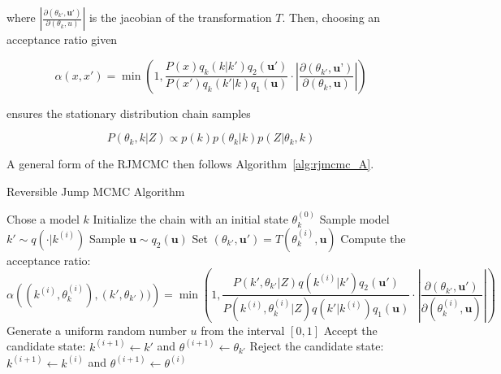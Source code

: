 \documentclass{article}
\begin{document}
where $\left|\frac{\partial(\theta_{k'}, \textbf{u}')}{\partial(\theta_k, u)} \right|$ is the jacobian of the transformation $T$. Then, choosing an acceptance ratio given 
 
 \begin{equation}
 \label{eq:alpharj}
  \alpha\left(x, x'\right) = \min\left(1, \frac{P(x)q_k(k | k')q_2(\textbf{u}') }{P(x')q_k(k' | k)q_1(\textbf{u}) }\cdot\left|\frac{\partial(\theta_{k'}, \textbf{u'})}{\partial(\theta_k, \mathbf{u})} \right|\right)
 \end{equation}


ensures the stationary distribution chain samples

\begin{equation}
P(\theta_k, k | Z) \propto p(k)p(\theta_k|k)p(Z | \theta_k, k)
\end{equation}

A general form of the RJMCMC then follows Algorithm~\ref{alg:rjmcmc_A}.

\begin{algorithm}[H]
\caption{Reversible Jump MCMC Algorithm}
\label{alg:rjmcmc_A}
\begin{algorithmic}[1]
    \State Chose a model $k$
    \State Initialize the chain with an initial state $\theta^{(0)}_{k}$
         \State Sample model $k' \sim q(\cdot | k^{(i)})$
         \State Sample $\mathbf{u} \sim q_2(\textbf{u})$
	\State Set $(\theta_{k'}, \mathbf{u'}) = T(\theta_k^{(i)}, \mathbf{u})$
        \State Compute the acceptance ratio:
        \[
        \alpha \left((k^{(i)}, \theta_k^{(i)}), (k', \theta_{k'})) \right) = \min\left(1, \frac{P\left(k', \theta_{k'} | Z\right)q(k^{(i)}|k')q_{2}(\mathbf{u}')}{P\left(k^{(i)}, \theta^{(i)}_{k} | Z\right)q(k' | k^{(i)})q_{1}(\textbf{u})} \cdot \left| \frac{\partial(\theta_{k'}, \textbf{u}')}{\partial(\theta_k^{(i)}, \textbf{u})}\right| \right)
        \]
        \State Generate a uniform random number $u$ from the interval $[0, 1]$
            \State Accept the candidate state: $k^{(i + 1)} \leftarrow k'$ and  $\theta^{(i+1)} \leftarrow \theta_{k'}$
        \Else
            \State Reject the candidate state:$k^{(i + 1)} \leftarrow k^{(i)}$ and  $\theta^{(i+1)} \leftarrow \theta^{(i)}$
        \EndIf
    \EndFor
\end{algorithmic}
\end{algorithm}




\end{document}
